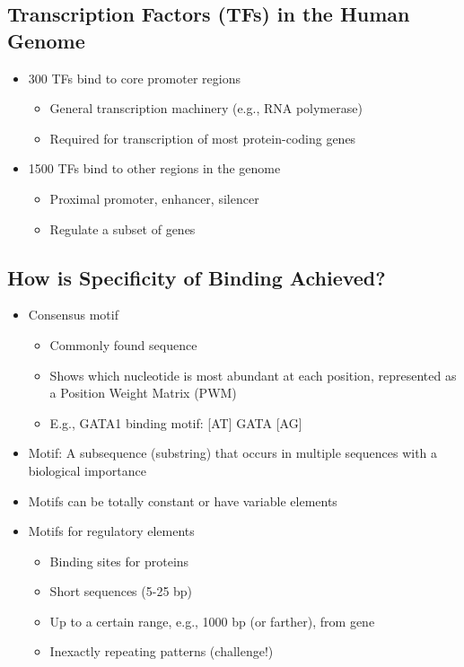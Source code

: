 \documentclass[10pt]{article}
\begin{document}
\subsection*{Transcription Factors (TFs) in the Human Genome}
\begin{itemize}
	\item 300 TFs bind to core promoter regions
	\begin{itemize}
	    \item General transcription machinery (e.g., RNA polymerase)
	    \item Required for transcription of most protein-coding genes
    \end{itemize}
    \item 1500 TFs bind to other regions in the genome
    \begin{itemize}
	    \item Proximal promoter, enhancer, silencer
	    \item Regulate a subset of genes
    \end{itemize}
\end{itemize}

\subsection*{How is Specificity of Binding Achieved?}
\begin{itemize}
	\item Consensus motif
	\begin{itemize}
	    \item Commonly found sequence
	    \item Shows which nucleotide is most abundant at each position, represented as a Position Weight Matrix (PWM)
	    \item E.g., GATA1 binding motif: [AT] GATA [AG]
    \end{itemize}
    \item Motif: A subsequence (substring) that occurs in multiple sequences with a biological importance
    \item Motifs can be totally constant or have variable elements
    \item Motifs for regulatory elements
    \begin{itemize}
	    \item Binding sites for proteins
	    \item Short sequences (5-25 bp)
	    \item Up to a certain range, e.g., 1000 bp (or farther), from gene
	    \item Inexactly repeating patterns (challenge!)
    \end{itemize}
\end{itemize}
\end{document}
